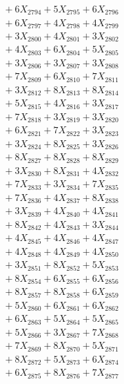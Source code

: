\documentclass[a4paper,10pt]{article}
\begin{document}
{\begin{align}
&\;  + 6 X_{2794} + 5 X_{2795} + 6 X_{2796} \\[0.3ex]
&\;  + 6 X_{2797} + 4 X_{2798} + 4 X_{2799} \\[0.5ex]\allowbreak
&\;  + 3 X_{2800} + 4 X_{2801} + 3 X_{2802} \\[0.3ex]
&\;  + 4 X_{2803} + 6 X_{2804} + 5 X_{2805} \\[0.3ex]
&\;  + 3 X_{2806} + 3 X_{2807} + 3 X_{2808} \\[0.3ex]
&\;  + 7 X_{2809} + 6 X_{2810} + 7 X_{2811} \\[0.3ex]
&\;  + 3 X_{2812} + 8 X_{2813} + 8 X_{2814} \\[0.3ex]
&\;  + 5 X_{2815} + 4 X_{2816} + 3 X_{2817} \\[0.3ex]
&\;  + 7 X_{2818} + 3 X_{2819} + 3 X_{2820} \\[0.3ex]
&\;  + 6 X_{2821} + 7 X_{2822} + 3 X_{2823} \\[0.3ex]
&\;  + 3 X_{2824} + 8 X_{2825} + 3 X_{2826} \\[0.3ex]
&\;  + 8 X_{2827} + 8 X_{2828} + 8 X_{2829} \\[0.5ex]\allowbreak
&\;  + 3 X_{2830} + 8 X_{2831} + 4 X_{2832} \\[0.3ex]
&\;  + 7 X_{2833} + 3 X_{2834} + 7 X_{2835} \\[0.3ex]
&\;  + 7 X_{2836} + 4 X_{2837} + 8 X_{2838} \\[0.3ex]
&\;  + 3 X_{2839} + 4 X_{2840} + 4 X_{2841} \\[0.3ex]
&\;  + 8 X_{2842} + 4 X_{2843} + 3 X_{2844} \\[0.3ex]
&\;  + 4 X_{2845} + 4 X_{2846} + 4 X_{2847} \\[0.3ex]
&\;  + 4 X_{2848} + 4 X_{2849} + 4 X_{2850} \\[0.3ex]
&\;  + 3 X_{2851} + 8 X_{2852} + 5 X_{2853} \\[0.3ex]
&\;  + 8 X_{2854} + 6 X_{2855} + 6 X_{2856} \\[0.3ex]
&\;  + 8 X_{2857} + 8 X_{2858} + 6 X_{2859} \\[0.5ex]\allowbreak
&\;  + 5 X_{2860} + 6 X_{2861} + 6 X_{2862} \\[0.3ex]
&\;  + 6 X_{2863} + 5 X_{2864} + 5 X_{2865} \\[0.3ex]
&\;  + 5 X_{2866} + 3 X_{2867} + 7 X_{2868} \\[0.3ex]
&\;  + 7 X_{2869} + 8 X_{2870} + 5 X_{2871} \\[0.3ex]
&\;  + 8 X_{2872} + 5 X_{2873} + 6 X_{2874} \\[0.3ex]
&\;  + 6 X_{2875} + 8 X_{2876} + 7 X_{2877} \\[0.3ex]

\end{align}}
\end{document}
